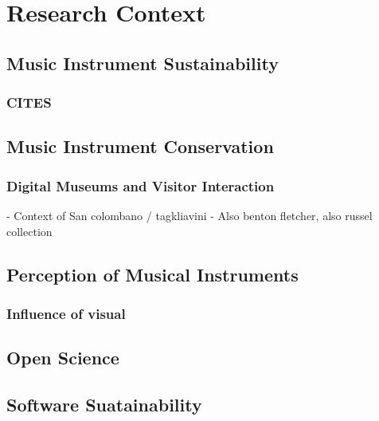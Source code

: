 \chapter{Research Context}
\section{Music Instrument Sustainability}
\subsection{CITES}
\section{Music Instrument Conservation}
\subsection{Digital Museums and Visitor Interaction}
- Context of San colombano / tagkliavini 
- Also benton fletcher, also russel collection
\section{Perception of Musical Instruments}
\subsection{Influence of visual}

\section{Open Science}
\section{Software Suatainability}



